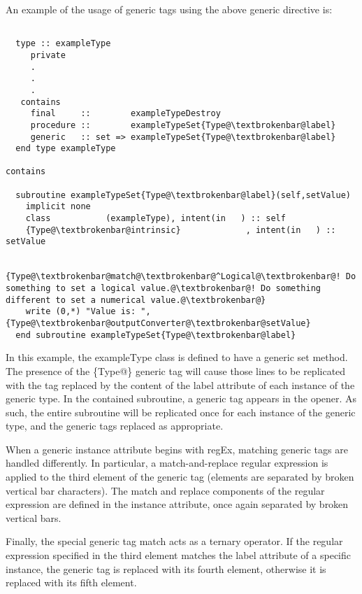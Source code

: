 An example of the usage of generic tags using the above generic directive is:
\lstset{escapechar=@}
\begin{lstlisting}

  type :: exampleType
     private
     .
     .
     .
   contains
     final     ::        exampleTypeDestroy
     procedure ::        exampleTypeSet{Type@\textbrokenbar@label}
     generic   :: set => exampleTypeSet{Type@\textbrokenbar@label}
  end type exampleType

contains

  subroutine exampleTypeSet{Type@\textbrokenbar@label}(self,setValue)
    implicit none
    class           (exampleType), intent(in   ) :: self
    {Type@\textbrokenbar@intrinsic}             , intent(in   ) :: setValue

    {Type@\textbrokenbar@match@\textbrokenbar@^Logical@\textbrokenbar@! Do something to set a logical value.@\textbrokenbar@! Do something different to set a numerical value.@\textbrokenbar@}
    write (0,*) "Value is: ",{Type@\textbrokenbar@outputConverter@\textbrokenbar@setValue}
  end subroutine exampleTypeSet{Type@\textbrokenbar@label}
\end{lstlisting}

In this example, the {\normalfont \ttfamily exampleType} class is defined to have a generic {\normalfont \ttfamily set} method. The presence of the {\normalfont \ttfamily \{Type@\textbrokenbar@label\}} generic tag will cause those lines to be replicated with the tag replaced by the content of the {\normalfont \ttfamily label} attribute of each instance of the generic type. In the contained subroutine, a generic tag appears in the opener. As such, the entire subroutine will be replicated once for each instance of the generic type, and the generic tags replaced as appropriate.

When a generic instance attribute begins with {\normalfont \ttfamily regEx}, matching generic tags are handled differently. In particular, a match-and-replace regular expression is applied to the third element of the generic tag (elements are separated by broken vertical bar characters). The match and replace components of the regular expression are defined in the instance attribute, once again separated by broken vertical bars.

Finally, the special generic tag {\normalfont \ttfamily match} acts as a ternary operator. If the regular expression specified in the third element matches the {\normalfont \ttfamily label} attribute of a specific instance, the generic tag is replaced with its fourth element, otherwise it is replaced with its fifth element.

